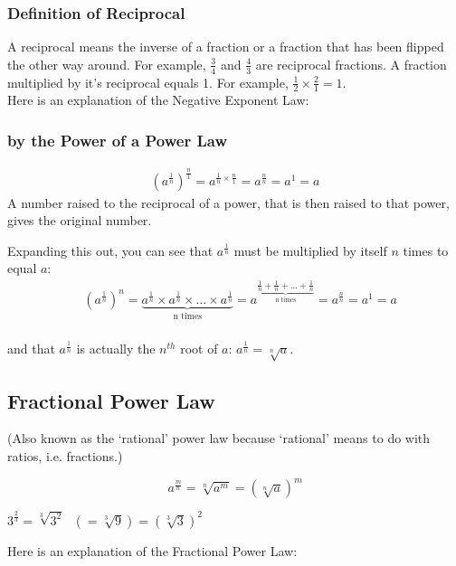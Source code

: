 \documentclass{article}
\begin{document}
\subsubsection{Definition of Reciprocal}
A reciprocal means the inverse of a fraction or a fraction that has been flipped the other way around.
For example, $\frac{3}{4}$ and $\frac{4}{3}$ are reciprocal fractions.
A fraction multiplied by it’s reciprocal equals 1.
For example, $\frac{1}{2} \times \frac{2}{1}=1$.\\

\noindent
Here is an explanation of the Negative Exponent Law:

\subsubsection{by the Power of a Power Law}
\begin{align*}
(a^{\frac{1}{n}})^{\frac{n}{1}}=a^{\frac{1}{n} \times \frac{n}{1}}=a^{\frac{n}{n}}=a^1=a
\end{align*}
A number raised to the reciprocal of a power, that is then raised to that power, gives the original number.

Expanding this out, you can see that $a^{\frac{1}{n}}$ must be multiplied by itself $n$ times to equal $a$:
\begin{align*}
&(a^{\frac{1}{n}})^n
=\underbrace{a^{\frac{1}{n}} \times a^{\frac{1}{n}} \times \ldots \times a^{\frac{1}{n}}}_{\text{n times}}
=a^{\underbrace{\frac{1}{n}+\frac{1}{n}+\ldots+\frac{1}{n}}_{\text{n times}}}
=a^{\frac{n}{n}}=a^1=a\\&
\end{align*}

and that $a^{\frac{1}{n}}$ is actually the $n^{th}$ root of $a$: $a^{\frac{1}{n}}=\sqrt[n]{a}$.

\subsection{Fractional Power Law}
(Also known as the ‘rational’ power law because ‘rational’ means to do with ratios, i.e. fractions.)

\begin{Large}
$$a^{\frac{m}{n}}=\sqrt[n]{a^m}=(\sqrt[n]{a})^m$$
\end{Large}
\begin{center}
$3^{\frac{2}{3}}=\sqrt[3]{3^2}\text{  }(=\sqrt[3]{9} ) =(\sqrt[3]{3})^2$
\end{center}
Here is an explanation of the Fractional Power Law:
\end{document}
